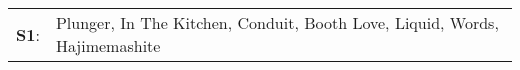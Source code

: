 \begin{supertabular}{p{0.03\textwidth}p{0.92\textwidth}}
 \textbf{S1}:  &  Plunger\textsuperscript{}, \enspace In The Kitchen\textsuperscript{}, \enspace Conduit\textsuperscript{}, \enspace Booth Love\textsuperscript{}, \enspace Liquid\textsuperscript{}, \enspace Words\textsuperscript{}, \enspace Hajimemashite\textsuperscript{}  \enspace  \\
\end{supertabular}
